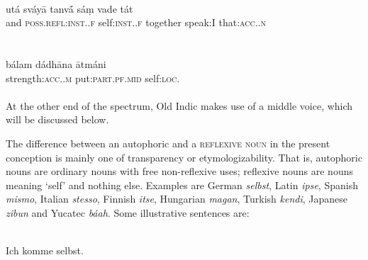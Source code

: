 \ea\label{ex:12}
\\
\gll utá  sváy\=a  tanv\'{\=a}  sá\d{m}  vade  tát\\
 and  \textsc{poss}.\textsc{refl}:\textsc{inst}.{\glsg}.\textsc{f}  self:\textsc{inst}.{\glsg}.\textsc{f}  together  speak:I  that:\textsc{acc}.\glsg.\textsc{n}\\
\\
\z
\noindent \ea\label{ex:13}
 \\
\gll bálam  dádh\=ana  \=atmáni\\
strength:\textsc{acc}.\glsg.\textsc{m}  put:\textsc{part}.\textsc{pf}.\textsc{mid}  self:\textsc{loc}.\glsg\\
\\
\z
\noindent At the other end of the spectrum, Old Indic makes use of a middle voice, which will be discussed below.

The difference between an autophoric and a \textsc{reflexive noun} in the present conception is mainly one of transparency or etymologizability. That is, autophoric nouns are ordinary nouns with free non-reflexive uses; reflexive nouns are nouns meaning ‘self’ and nothing else. Examples are German \textit{selbst}, Latin \textit{ipse}, Spanish \textit{mismo}, Italian \textit{stesso}, Finnish \textit{itse}, Hungarian \textit{magan}, Turkish \textit{kendi}, Japanese \textit{zibun} and Yucatec \textit{báah}. Some illustrative sentences are:

\ea\label{ex:E14}
\langinfo{\LangGerm}{}{}\\
 \ea
 Ich komme selbst.\\
  
